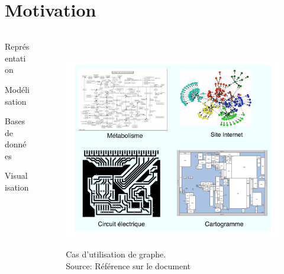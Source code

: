 \documentclass[10pt]{beamer}
\begin{document}
\section[Motivation]{Motivation}
\begin{frame}{}
\begin{columns}
\begin{column}{0.2\textwidth}
     \centering
    \begin{block}{}
    \footnotesize Représentation\\ [.5cm]
    \end{block}
    \begin{block}{}
    \footnotesize Modélisation \\ [.5cm]
    \end{block}
    \begin{block}{}    
    \footnotesize Bases de données\\[.5cm]
    \end{block}
    \begin{block}{}    
    \footnotesize Visualisation\\[.5cm]
    \end{block}
\end{column}

\begin{column}{0.75\textwidth}
    \\[-.5cm]    
    \begin{figure}
	\centering
	\includegraphics[height=0.86\textheight]{motivation.png}\\[-.2cm]
    \caption[caption]{Cas d'utilisation de graphe.  \\\vspace*{0.1cm} Source: Référence sur le document \citeauthor{fusy2007combinatoire}}	
	\end{figure}
        \end{column}
    \end{columns}

\end{frame}
\end{document}
